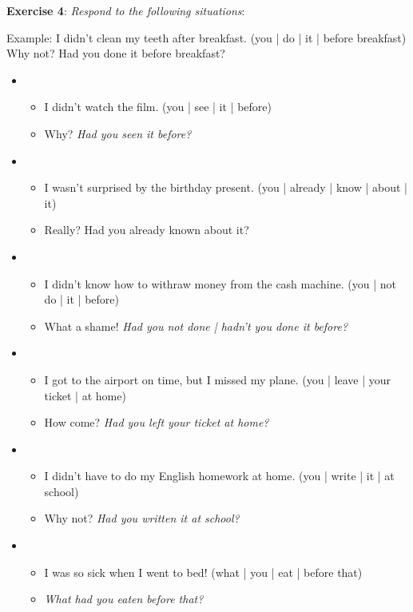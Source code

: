 \textbf{Exercise 4}: \textit{Respond to the following situations}:

Example:
I didn't clean my teeth after breakfast.
(you | do | it | before breakfast)
Why not? Had you done it before breakfast?

\begin{itemize}

\item
\begin{itemize}
\item I didn't watch the film. (you | see | it | before)
\item Why? \textit{Had you seen it before?}
\end{itemize}

\item
\begin{itemize}
\item I wasn't surprised by the birthday present. (you | already | know | about | it)
\item Really? Had you already known about it?
\end{itemize}

\item
\begin{itemize}
\item I didn't know how to withraw money from the cash machine. (you | not do | it | before)
\item What a shame! \textit{Had you not done | hadn't you done it before?}
\end{itemize}

\item
\begin{itemize}
\item I got to the airport on time, but I missed my plane. (you | leave | your ticket | at home)
\item How come? \textit{Had you left your ticket at home?}
\end{itemize}

\item
\begin{itemize}
\item I didn't have to do my English homework at home. (you | write | it | at school)
\item Why not? \textit{Had you written it at school?}
\end{itemize}

\item
\begin{itemize}
\item I was so sick when I went to bed! (what | you | eat | before that)
\item \textit{What had you eaten before that?}
\end{itemize}


\end{itemize}
